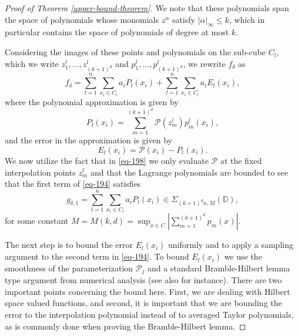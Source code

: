 \begin{proof}[Proof of Theorem \ref{upper-bound-theorem}]
 We note that these polynomials span the space of polynomials whose monomials $z^\alpha$ satisfy $|\alpha|_\infty \leq k$, which in particular contains the space of polynomials of degree at most $k$.
 
 Considering the images of these points and polynomials on the sub-cube $C_l$, which we write $z_1^l,...,z_{(k+1)^d}^l$ and $p^l_1,...,p^l_{(k+1)^d}$, we rewrite $f_\delta$ as
 \begin{equation}\label{eq-194}
  f_\delta = \sum_{l=1}^{n}\sum_{x_i\in C_l}a_iP_l(x_i) +  \sum_{l=1}^{n}\sum_{x_i\in C_l}a_iE_l(x_i),
 \end{equation}
 where the polynomial approximation is given by
 \begin{equation}\label{eq-198}
  P_l(x_i) = \sum_{m=1}^{(k+1)^d} \mathcal{P}(z_m^l)p_m^l(x_i),
 \end{equation}
 and the error in the approximation is given by
 \begin{equation}
  E_l(x_i) = \mathcal{P}(x_i) - P_l(x_i).
 \end{equation}
 We now utilize the fact that in \eqref{eq-198} we only evaluate $\mathcal{P}$ at the fixed interpolation points $z_m^l$ and that the Lagrange polynomials are bounded to see that the first term of \eqref{eq-194} satisfies
 \begin{equation}
  g_{\delta,1} = \sum_{l=1}^{n}\sum_{x_i\in C_l}a_iP_l(x_i) \in \Sigma_{(k+1)^dn,M}(\mathbb{D}),
 \end{equation}
 for some constant $M = M(k,d) = \sup_{x\in C}\left|\sum_{m=1}^{(k+1)^d} p_m(x)\right|$.
 
 The next step is to bound the error $E_l(x_i)$ uniformly and to apply a sampling argument to the second term in \eqref{eq-194}. To bound $E_l(x_i)$ we use the smoothness of the parameterization $\mathcal{P}_j$ and a standard Bramble-Hilbert lemma \cite{bramble1970estimation} type argument from numerical analysis (see also \cite{xu1982error} for instance). There are two important points concerning the bound here. First, we are dealing with Hilbert space valued functions, and second, it is important that we are bounding the error to the interpolation polynomial instead of to averaged Taylor polynomials, as is commonly done when proving the Bramble-Hilbert lemma.
 

\end{proof}
